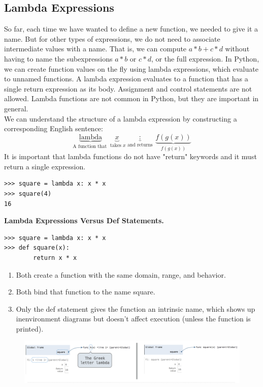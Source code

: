 \documentclass[11pt]{article}
\begin{document}
\subsection{Lambda Expressions} 
So far, each time we have wanted to define a new function, we needed to give it a name. But for other types of expressions, we do not need to associate intermediate values with a name. That is, we can compute $a*b + c*d$ without having to name the subexpressions $a*b$ or $c*d$, or the full expression. In Python, we can create function values on the fly using lambda expressions, which evaluate to unnamed functions. A lambda expression evaluates to a function that has a single return expression as its body. Assignment and control statements are not allowed. Lambda functions are not common in Python, but they are important in general. \\
\newline
We can understand the structure of a lambda expression by constructing a corresponding English sentence: 
$$\underbrace{\text{lambda}}_{\text{A function that }} \underbrace{x}_{\text{ takes } x} \underbrace{:}_{\text{ and returns }} \underbrace{f(g(x))}_{ f(g(x)) }$$
It is important that lambda functions do not have "return" keywords and it must return a single expression. 
\begin{lstlisting}
>>> square = lambda x: x * x
>>> square(4)
16
\end{lstlisting} 
\newpage
\textbf{Lambda Expressions Versus Def Statements.} 
\begin{lstlisting}
>>> square = lambda x: x * x
>>> def square(x):
		return x * x	
\end{lstlisting}
\begin{enumerate}[leftmargin = *]
\item Both create a function with the same domain, range, and behavior.
\item Both bind that function to the name square. 
\item Only the def statement gives the function an intrinsic name, which shows up inenvironment diagrams but doesn't affect execution (unless the function is printed).
\end{enumerate}
\begin{figure}[h]
\includegraphics[scale=0.5]{4_1} 
\centering
\end{figure}
\end{document}
